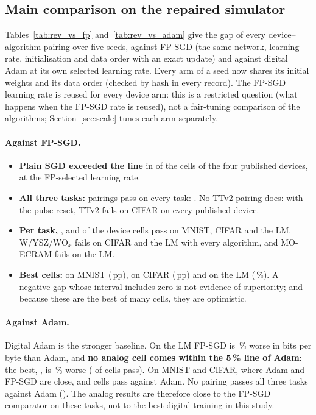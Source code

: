 \subsection{Main comparison on the repaired simulator}\label{sec:main}
Tables~\ref{tab:rev_vs_fp} and~\ref{tab:rev_vs_adam} give the gap of every device--algorithm pairing over five seeds, against
FP-SGD (the same network, learning rate, initialisation and data order with an exact update) and against digital Adam at its
own selected learning rate. Every arm of a seed now shares its initial weights and its data order (checked by hash in every
record). The FP-SGD learning rate is reused for every device arm: this is a restricted question (what happens when the FP-SGD
rate is reused), not a fair-tuning comparison of the algorithms; Section~\ref{sec:scale} tunes each arm separately.

\paragraph{Against FP-SGD.}
\begin{itemize}
\item \textbf{Plain SGD exceeded the line} in \RVSgdPubFail{} of the \RVSgdPubN{} cells of the four published devices, at the
      FP-selected learning rate.
\item \textbf{All three tasks:} \RVAllThreeFpN{} pairings pass on every task: \RVAllThreeFpList. No TTv2 pairing does: with the
      pulse reset, TTv2 fails on CIFAR on every published device.
\item \textbf{Per task,} \RVMnistFpPassN, \RVCifarFpPassN{} and \RVLmFpPassN{} of the \RVMnistFpCellN{} device cells pass on
      MNIST, CIFAR and the LM. W/YSZ/WO$_x$ fails on CIFAR and the LM with every algorithm, and MO-ECRAM fails on the LM.
\item \textbf{Best cells:} \RVMnistFpBestCell{} on MNIST (\RVMnistFpBestGap\,pp), \RVCifarFpBestCell{} on CIFAR
      (\RVCifarFpBestGap\,pp) and \RVLmFpBestCell{} on the LM (\RVLmFpBestGap\,\%). A negative gap whose interval includes zero
      is not evidence of superiority; and because these are the best of many cells, they are optimistic.
\end{itemize}

\paragraph{Against Adam.} Digital Adam is the stronger baseline. On the LM FP-SGD is \RVLmFpSgdVsAdamPct\,\% worse in bits per
byte than Adam, and \textbf{no analog cell comes within the 5\,\% line of Adam}: the best, \RVLmAdamBestCell, is
\RVLmAdamBestGap\,\% worse (\RVLmAdamPassN{} of \RVLmAdamCellN{} cells pass). On MNIST and CIFAR, where Adam and FP-SGD are
close, \RVMnistAdamPassN{} and \RVCifarAdamPassN{} cells pass against Adam. No pairing passes all three tasks against Adam
(\RVAllThreeAdamN). The analog results are therefore close to the FP-SGD comparator on these tasks, not to the best digital
training in this study.

